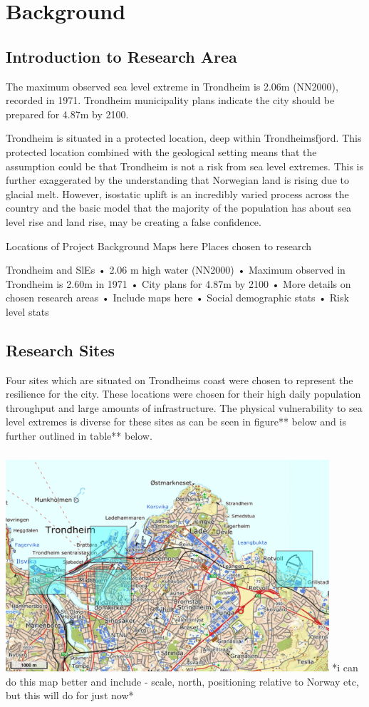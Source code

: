 \chapter{Background}

\section{Introduction to Research Area}

The maximum observed sea level extreme in Trondheim is 2.06m (NN2000), recorded in 1971. Trondheim municipality plans indicate the city should be prepared for 4.87m by 2100. 

Trondheim is situated in a protected location, deep within Trondheimsfjord. This protected location combined with the geological setting means that the assumption could be that Trondheim is not a risk from sea level extremes. This is further exaggerated by the understanding that Norwegian land is rising due to glacial melt. However, isostatic uplift is an incredibly varied process across the country and the basic model that the majority of the population has about sea level rise and land rise, may be creating a false confidence. 



Locations of Project Background
Maps here
Places chosen to research 

Trondheim and SlEs
•	2.06 m high water (NN2000)
•	Maximum observed in Trondheim is 2.60m in 1971
•	City plans for 4.87m by 2100
•	More details on chosen research areas
•	Include maps here 
•	Social demographic stats
•	Risk level stats

\section{Research Sites}
Four sites which are situated on Trondheims coast were chosen to represent the resilience for the city. These locations were chosen for their high daily population throughput and large amounts of infrastructure. The physical vulnerability to sea level extremes is diverse for these sites as can be seen in figure** below and is further outlined in table** below. 
\paragraph{}
\includegraphics[width=0.9\textwidth]{fig/map of chosen areas.png}
*i can do this map better and include - scale, north, positioning relative to Norway etc, but this will do for just now*


